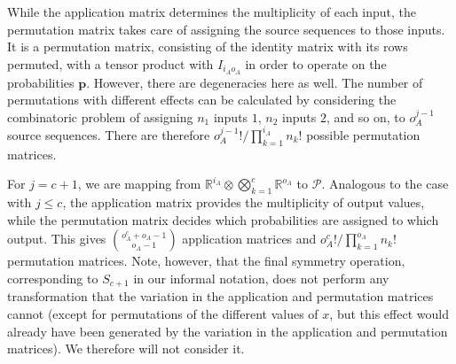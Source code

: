 \documentclass[10pt, a4paper]{article}
\numberwithin{equation}{section} %
\theoremstyle{definition}
\theoremstyle{plain}
\newcommand{\?}{\mathrel{?}} %
\newcommand{\R}{\mathbb{R}} %
\newcommand{\cvec}[1]{\boldsymbol{\mathbf{#1}}}    %
\newcommand{\sP}{\mathcal{P}}
\begin{document}
      While the application matrix determines the multiplicity of each input, the permutation matrix takes care of assigning the source sequences to those inputs. It is a permutation matrix, consisting of the identity matrix with its rows permuted, with a tensor product with \(I_{i_A o_A}\) in order to operate on the probabilities \(\cvec{p}\). However, there are degeneracies here as well. The number of permutations with different effects can be calculated by considering the combinatoric problem of assigning \(n_1\) inputs \(1\), \(n_2\) inputs \(2\), and so on, to \(o_A^{j-1}\) source sequences. There are therefore \(o_A^{j-1}!/\prod_{k=1}^{i_A} n_k!\) possible permutation matrices.

      For \(j = c+1\), we are mapping from \(\R^{i_A} \otimes \bigotimes_{k=1}^{c} \R^{o_A}\) to \(\sP\). Analogous to the case with \(j \leq c\), the application matrix provides the multiplicity of output values, while the permutation matrix decides which probabilities are assigned to which output. This gives \(\binom{o_A^c + o_A-1}{o_A-1}\) application matrices and \(o_A^c!/\prod_{k=1}^{o_A} n_k!\) permutation matrices. Note, however, that the final symmetry operation, corresponding to \(S_{c+1}\) in our informal notation, does not perform any transformation that the variation in the application and permutation matrices cannot (except for permutations of the different values of \(x\), but this effect would already have been generated by the variation in the application and permutation matrices). We therefore will not consider it.
\end{document}

